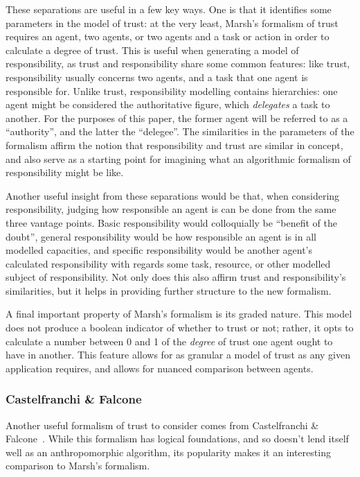 These separations are useful in a few key ways. One is that it identifies some parameters in the model of trust: at the very least, Marsh's formalism of trust requires an agent, two agents, or two agents and a task or action in order to calculate a degree of trust. This is useful when generating a model of responsibility, as trust and responsibility share some common features: like trust, responsibility usually concerns two agents, and a task that one agent is responsible for. Unlike trust, responsibility modelling contains hierarchies: one agent might be considered the authoritative figure, which \emph{delegates} a task to another. For the purposes of this paper, the former agent will be referred to as a ``authority'', and the latter the ``delegee''. The similarities in the parameters of the formalism affirm the notion that responsibility and trust are similar in concept, and also serve as a starting point for imagining what an algorithmic formalism of responsibility might be like.\par

Another useful insight from these separations would be that, when considering responsibility, judging how responsible an agent is can be done from the same three vantage points. Basic responsibility would colloquially be ``benefit of the doubt'', general responsibility would be how responsible an agent is in all modelled capacities, and specific responsibility would be another agent's calculated responsibility with regards some task, resource, or other modelled subject of responsibility. Not only does this also affirm trust and responsibility's similarities, but it helps in providing further structure to the new formalism.\par

A final important property of Marsh's formalism is its graded nature. This model does not produce a boolean indicator of whether to trust or not; rather, it opts to calculate a number between 0 and 1 of the \emph{degree} of trust one agent ought to have in another. This feature allows for as granular a model of trust as any given application requires, and allows for nuanced comparison between agents.\par


\subsubsection{Castelfranchi \& Falcone~\cite{CastelfranchiSocialApproach}}
Another useful formalism of trust to consider comes from Castelfranchi \& Falcone\cite{CastelfranchiSocialApproach}~. While this formalism has logical foundations, and so doesn't lend itself well as an anthropomorphic algorithm, its popularity makes it an interesting comparison to Marsh's formalism.\par

